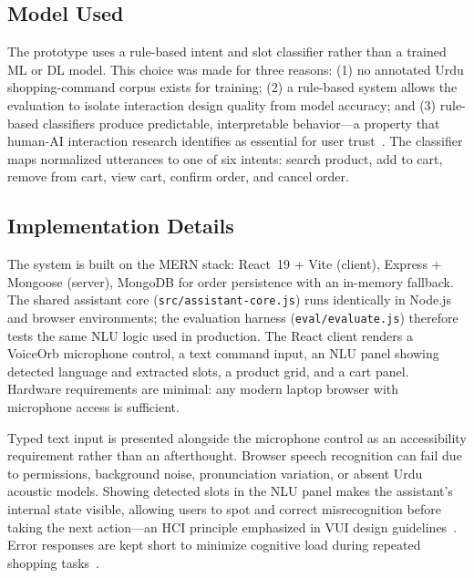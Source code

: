 \documentclass[conference]{IEEEtran}
\begin{document}
\subsection{Model Used}

The prototype uses a rule-based intent and slot classifier rather than
a trained ML or DL model. This choice was made for three reasons:
(1) no annotated Urdu shopping-command corpus exists for training;
(2) a rule-based system allows the evaluation to isolate interaction
design quality from model accuracy; and (3) rule-based classifiers
produce predictable, interpretable behavior---a property that
human-AI interaction research identifies as essential for
user trust~\cite{amershi2019guidelines}. The classifier maps
normalized utterances to one of six intents: search product, add to
cart, remove from cart, view cart, confirm order, and cancel order.

\subsection{Implementation Details}

The system is built on the MERN stack: React~19 + Vite (client),
Express + Mongoose (server), MongoDB for order persistence with an
in-memory fallback. The shared assistant core
(\texttt{src/assistant-core.js}) runs identically in Node.js and
browser environments; the evaluation harness (\texttt{eval/evaluate.js})
therefore tests the same NLU logic used in production. The React client
renders a VoiceOrb microphone control, a text command input, an NLU
panel showing detected language and extracted slots, a product grid,
and a cart panel. Hardware requirements are minimal: any modern laptop
browser with microphone access is sufficient.

Typed text input is presented alongside the microphone control as an
accessibility requirement rather than an afterthought. Browser speech
recognition can fail due to permissions, background noise,
pronunciation variation, or absent Urdu acoustic models.
Showing detected slots in the NLU panel makes the assistant's
internal state visible, allowing users to spot and correct
misrecognition before taking the next action---an HCI principle
emphasized in VUI design guidelines~\cite{murad2023guidelines,
park2024voice}. Error responses are kept short to minimize cognitive
load during repeated shopping tasks~\cite{ocon2020overload}.

\end{document}

